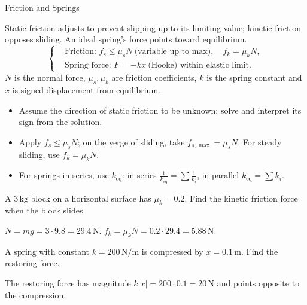 \begin{KnowledgePoint}{Friction and Springs \Core}
  \KPFormulas
  \begin{formulabox}
  Static friction adjusts to prevent slipping up to its limiting value; kinetic friction opposes sliding. An ideal spring's force points toward equilibrium.
  \[
  \left\{\begin{aligned}
    &\text{Friction: } f_s\le \mu_s N\ \text{(variable up to max)},\quad f_k=\mu_k N,\\
    &\text{Spring force: } F=-kx\ \text{(Hooke) within elastic limit}.
  \end{aligned}\right.
  \]
  $N$ is the normal force, $\mu_s,\mu_k$ are friction coefficients, $k$ is the spring constant and $x$ is signed displacement from equilibrium.
  \end{formulabox}

  \KPHeuristics
\begin{heuristicsbox}
\begin{itemize}[leftmargin=*]
  \item Assume the direction of static friction to be unknown; solve and interpret its sign from the solution.
  \item Apply $f_s\le \mu_s N$; on the verge of sliding, take $f_{s,\max}=\mu_s N$. For steady sliding, use $f_k=\mu_k N$.
  \item For springs in series, use $k_{\text{eq}}$: in series $\tfrac{1}{k_{\text{eq}}}=\sum \tfrac{1}{k_i}$, in parallel $k_{\text{eq}}=\sum k_i$.
\end{itemize}
\end{heuristicsbox}

  \KPProblems
\begin{cheatproblem}
  A $3\,\text{kg}$ block on a horizontal surface has $\mu_k=0.2$. Find the kinetic friction force when the block slides.
\begin{solutionbox}
  $N=mg=3\cdot9.8=29.4\,\text{N}$. $f_k=\mu_k N=0.2\cdot29.4=5.88\,\text{N}$.
\end{solutionbox}
\end{cheatproblem}
\begin{cheatproblem}
  A spring with constant $k=200\,\text{N/m}$ is compressed by $x=0.1\,\text{m}$. Find the restoring force.
\begin{solutionbox}
  The restoring force has magnitude $k|x|=200\cdot0.1=20\,\text{N}$ and points opposite to the compression.
\end{solutionbox}
\end{cheatproblem}
\end{KnowledgePoint}

